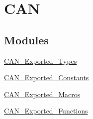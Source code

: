 \hypertarget{group__CAN}{
\section{CAN}
\label{group__CAN}
}
\subsection*{Modules}
\begin{DoxyCompactItemize}
\item 
\hyperlink{group__CAN__Exported__Types}{CAN\_\-Exported\_\-Types}
\item 
\hyperlink{group__CAN__Exported__Constants}{CAN\_\-Exported\_\-Constants}
\item 
\hyperlink{group__CAN__Exported__Macros}{CAN\_\-Exported\_\-Macros}
\item 
\hyperlink{group__CAN__Exported__Functions}{CAN\_\-Exported\_\-Functions}
\end{DoxyCompactItemize}
